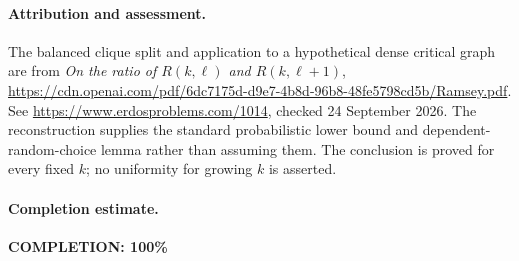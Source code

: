\paragraph{Attribution and assessment.}
The balanced clique split and application to a hypothetical dense critical graph are from \emph{On the ratio of \(R(k,\ell)\) and \(R(k,\ell+1)\)}, \url{https://cdn.openai.com/pdf/6dc7175d-d9e7-4b8d-96b8-48fe5798cd5b/Ramsey.pdf}. See \url{https://www.erdosproblems.com/1014}, checked 24 September 2026. The reconstruction supplies the standard probabilistic lower bound and dependent-random-choice lemma rather than assuming them. The conclusion is proved for every fixed \(k\); no uniformity for growing \(k\) is asserted.

\paragraph{Completion estimate.}
\textbf{COMPLETION: 100\%}
